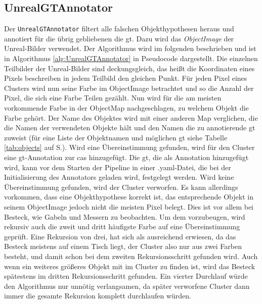 \subsection{UnrealGTAnnotator}
Der \texttt{UnrealGTAnnotator} filtert alle falschen Objekthypothesen heraus und annotiert für die übrig gebliebenen die \gls{gt}. Dazu wird das \textit{ObjectImage} der Unreal-Bilder verwendet. Der Algorithmus wird im folgenden beschrieben und ist in Algorithmus \ref{alg:UnrealGTAnnotator} in Pseudocode dargestellt. Die einzelnen Teilbilder der Unreal-Bilder sind deckungsgleich, das heißt die Koordinaten eines Pixels beschreiben in jedem Teilbild den gleichen Punkt. Für jeden Pixel eines Clusters wird nun seine Farbe im ObjectImage betrachtet und so die Anzahl der Pixel, die sich eine Farbe Teilen gezählt. Nun wird für die am meisten vorkommende Farbe in der ObjectMap nachgeschlagen, zu welchem Objekt die Farbe gehört. Der Name des Objektes wird mit einer anderen Map verglichen, die die Namen der verwendeten Objekte hält und den Namen die zu annotierende \gls{gt} zuweist (für eine Liste der Objektnamen und möglichen \gls{gt} siehe Tabelle \ref{tab:objects} auf S.\pageref{tab:unrealObjects}). Wird eine Übereinstimmung gefunden, wird für den Cluster eine \gls{gt}-Annotation zur \gls{cas} hinzugefügt. Die \gls{gt}, die als Annotation hinzugefügt wird, kann vor dem Starten der Pipeline in einer .yaml-Datei, die bei der Initialisierung des Annotators geladen wird, festgelegt werden. Wird keine Übereinstimmung gefunden, wird der Cluster verworfen. Es kann allerdings vorkommen, dass eine Objekthypothese korrekt ist, das entsprechende Objekt in seinem ObjectImage jedoch nicht die meisten Pixel belegt. Dies ist vor allem bei Besteck, wie Gabeln und Messern zu beobachten. Um dem vorzubeugen, wird rekursiv auch die zweit und dritt häufigste Farbe auf eine Übereinstimmung geprüft. Eine Rekursion von drei, hat sich als ausreichend erwiesen, da das Besteck meistens auf einem Tisch liegt, der Cluster also nur aus zwei Farben besteht, und damit schon bei dem zweiten Rekursionsschritt gefunden wird. Auch wenn ein weiteres größeres Objekt mit im Cluster zu finden ist, wird das Besteck spätestens im dritten Rekursionsschritt gefunden. Ein vierter Durchlauf würde den Algorithmus nur unnötig verlangsamen, da später verworfene Cluster dann immer die gesamte Rekursion komplett durchlaufen würden. 

